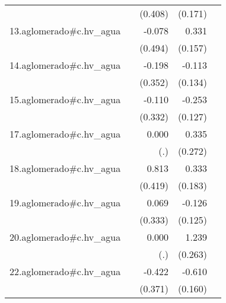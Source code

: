 {\begin{longtable}{l*{4}{D{.}{.}{-1}}}
            &                     &     (0.408)         &     (0.171)         &                     \\
\addlinespace
13.aglomerado#c.hv\_agua&                     &      -0.078         &       0.331\sym{*}  &                     \\
            &                     &     (0.494)         &     (0.157)         &                     \\
\addlinespace
14.aglomerado#c.hv\_agua&                     &      -0.198         &      -0.113         &                     \\
            &                     &     (0.352)         &     (0.134)         &                     \\
\addlinespace
15.aglomerado#c.hv\_agua&                     &      -0.110         &      -0.253\sym{*}  &                     \\
            &                     &     (0.332)         &     (0.127)         &                     \\
\addlinespace
17.aglomerado#c.hv\_agua&                     &       0.000         &       0.335         &                     \\
            &                     &         (.)         &     (0.272)         &                     \\
\addlinespace
18.aglomerado#c.hv\_agua&                     &       0.813         &       0.333         &                     \\
            &                     &     (0.419)         &     (0.183)         &                     \\
\addlinespace
19.aglomerado#c.hv\_agua&                     &       0.069         &      -0.126         &                     \\
            &                     &     (0.333)         &     (0.125)         &                     \\
\addlinespace
20.aglomerado#c.hv\_agua&                     &       0.000         &       1.239\sym{***}&                     \\
            &                     &         (.)         &     (0.263)         &                     \\
\addlinespace
22.aglomerado#c.hv\_agua&                     &      -0.422         &      -0.610\sym{***}&                     \\
            &                     &     (0.371)         &     (0.160)         &                     \\

\end{longtable}}
